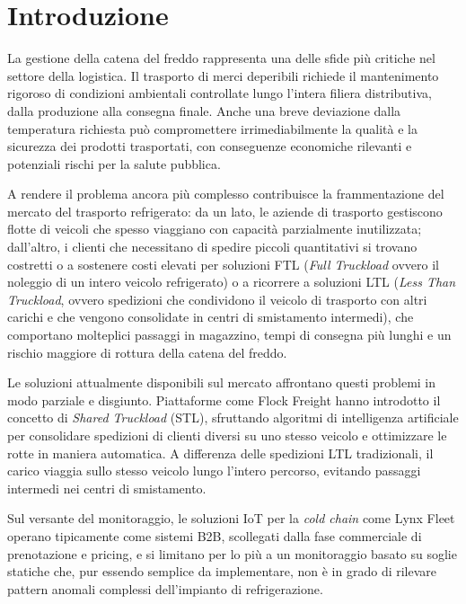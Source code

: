 \chapter{Introduzione}
\label{ch:introduzione}

La gestione della catena del freddo rappresenta una delle sfide più critiche nel settore della logistica. Il trasporto di merci deperibili richiede il mantenimento rigoroso di condizioni ambientali controllate lungo l'intera filiera distributiva, dalla produzione alla consegna finale. Anche una breve deviazione dalla temperatura richiesta può compromettere irrimediabilmente la qualità e la sicurezza dei prodotti trasportati, con conseguenze economiche rilevanti e potenziali rischi per la salute pubblica. 

A rendere il problema ancora più complesso contribuisce la frammentazione del mercato del trasporto refrigerato: da un lato, le aziende di trasporto gestiscono flotte di veicoli che spesso viaggiano con capacità parzialmente inutilizzata; dall'altro, i clienti che necessitano di spedire piccoli quantitativi si trovano costretti o a sostenere costi elevati per soluzioni FTL (\textit{Full Truckload} ovvero il noleggio di un intero veicolo refrigerato) o a ricorrere a soluzioni LTL (\textit{Less Than Truckload}, ovvero spedizioni che condividono il veicolo di trasporto con altri carichi e che vengono consolidate in centri di smistamento intermedi), che comportano molteplici passaggi in magazzino, tempi di consegna più lunghi e un rischio maggiore di rottura della catena del freddo. 

Le soluzioni attualmente disponibili sul mercato affrontano questi problemi in modo parziale e disgiunto. Piattaforme come Flock Freight \cite{flockfreight2024} hanno introdotto il concetto di \textit{Shared Truckload} (STL), sfruttando algoritmi di intelligenza artificiale per consolidare spedizioni di clienti diversi su uno stesso veicolo e ottimizzare le rotte in maniera automatica. A differenza delle spedizioni LTL tradizionali, il carico viaggia sullo stesso veicolo lungo l’intero percorso, evitando passaggi intermedi nei centri di smistamento. 

Sul versante del monitoraggio, le soluzioni IoT per la \textit{cold chain} come Lynx Fleet \cite{carrierlynx2024} operano tipicamente come sistemi B2B, scollegati dalla fase commerciale di prenotazione e pricing, e si limitano per lo più a un monitoraggio basato su soglie statiche che, pur essendo semplice da implementare, non è in grado di rilevare pattern anomali complessi dell'impianto di refrigerazione.

